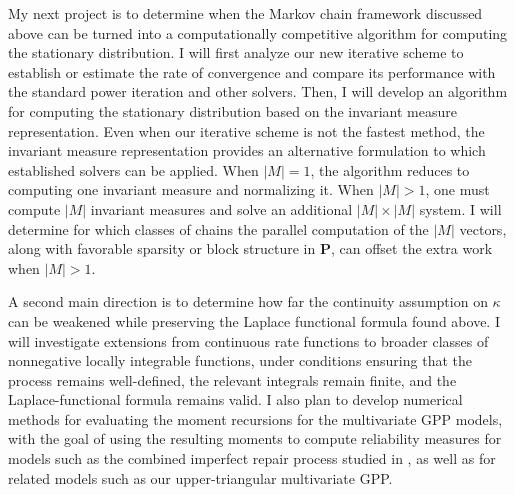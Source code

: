 \documentclass[11pt]{article}
\newenvironment{changemargin}[2]{%
\begin{list}{}{%
\setlength{\topsep}{0pt}%
\setlength{\leftmargin}{#1}%
\setlength{\rightmargin}{#2}%
\setlength{\listparindent}{\parindent}%
\setlength{\itemindent}{\parindent}%
\setlength{\parsep}{\parskip}%
}%
\item[]}{\end{list}}
\begin{document}
\begin{changemargin}{-0.5cm}{-0.5cm}
My next project is to determine when the Markov chain framework discussed above can be turned into a computationally competitive algorithm for computing the stationary distribution. 
I will first analyze our new iterative scheme to establish or estimate the rate of convergence and compare its performance with the standard power iteration and other solvers. Then, I will develop an algorithm for computing the stationary distribution based on the invariant measure representation. Even when our iterative scheme is not the fastest method, the invariant measure representation provides an alternative formulation to which established solvers can be applied. When $|M|=1$, the algorithm reduces to computing one invariant measure and normalizing it. When $|M|>1$, one must compute $|M|$ invariant measures and solve an additional $|M|\times |M|$ system. I will determine for which classes of chains the parallel computation of the $|M|$ vectors, along with favorable sparsity or block structure in $\mathbf{P}$, can offset the extra work when $|M|>1$.


A second main direction is to determine how far the continuity assumption on $\kappa$ can be weakened while preserving the Laplace functional formula found above. I will investigate extensions from continuous rate functions to broader classes of nonnegative locally integrable functions, under conditions ensuring that the process remains well-defined, the relevant integrals remain finite, and the Laplace-functional formula remains valid.
I also plan to develop numerical methods for evaluating the moment recursions for the multivariate GPP models, with the goal of using the resulting moments to compute reliability measures for models such as the combined imperfect repair process studied in \cite{ChaFinkelstein2024}, as well as for related models such as our upper-triangular multivariate GPP.



\end{changemargin}
\end{document}

